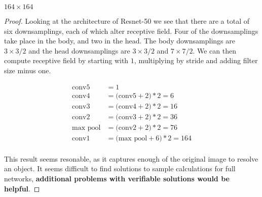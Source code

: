 \documentclass[11pt]{article}
\begin{document}
\begin{solution}
	$164\times164$
\end{solution}
\begin{proof}

	Looking at the architecture of Resnet-50 we see that there are a total of
	six downsamplings, each of which alter receptive field. Four of the
	downsamplings take place in the body, and two in the head. The body
	downsamplings are $3\times3/2$ and the head downsamplings are $3\times3/2$
	and $7\times7/2$. We can then compute receptive field by starting with $1$,
	multiplying by stride and adding filter size minus one.

	\begin{align}
		\text{conv5} &= 1 \\
		\text{conv4} &= \big(\text{conv5}+2\big)*2 = 6  \\
		\text{conv3} &= \big(\text{conv4}+2\big)*2 = 16  \\
		\text{conv2} &= \big(\text{conv3}+2\big)*2 = 36  \\
		\text{max pool} &= \big(\text{conv2}+2\big)*2 = 76  \\
		\text{conv1} &= \big(\text{max pool}+6\big)*2 = 164  \\
	\end{align}

	\noindent
	This result seems resonable, as it captures enough of the original image to
	resolve an object. It seems difficult to find solutions to sample
	calculations for full networks, \textbf{additional problems with verifiable
	solutions would be helpful}.

\end{proof}
\end{document}
